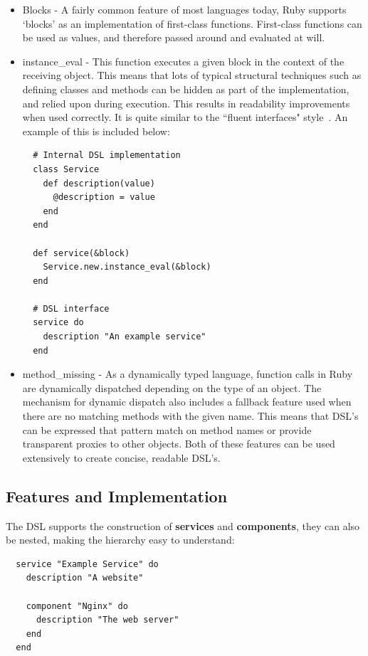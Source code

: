 \documentclass{cshonours}
\begin{document}
\begin{itemize}
  \item{Blocks} - A fairly common feature of most languages today, Ruby supports `blocks' as an implementation of first-class functions. First-class functions can be used as values, and therefore passed around and evaluated at will.

  \item{instance\_eval} - This function executes a given block in the context of the receiving object. This means that lots of typical structural techniques such as defining classes and methods can be hidden as part of the implementation, and relied upon during execution. This results in readability improvements when used correctly. It is quite similar to the ``fluent interfaces" style~\cite{FluentInterfaces}. An example of this is included below:

  \begin{verbatim}
  # Internal DSL implementation
  class Service
    def description(value)
      @description = value
    end
  end

  def service(&block)
    Service.new.instance_eval(&block)
  end

  # DSL interface
  service do
    description "An example service"
  end
  \end{verbatim}
  \label{fig:MetaProgrammingSnippet}

  \item{method\_missing} - As a dynamically typed language, function calls in Ruby are dynamically dispatched depending on the type of an object. The mechanism for dynamic dispatch also includes a fallback feature used when there are no matching methods with the given name. This means that DSL's can be expressed that pattern match on method names or provide transparent proxies to other objects. Both of these features can be used extensively to create concise, readable DSL's.
\end{itemize}

\subsection{Features and Implementation}

The DSL supports the construction of \textbf{services} and \textbf{components}, they can also be nested, making the hierarchy easy to understand:

\begin{verbatim}
  service "Example Service" do
    description "A website"

    component "Nginx" do
      description "The web server"
    end
  end
\end{verbatim}
\label{fig:MetaProgrammingSnippet}
\end{document}
